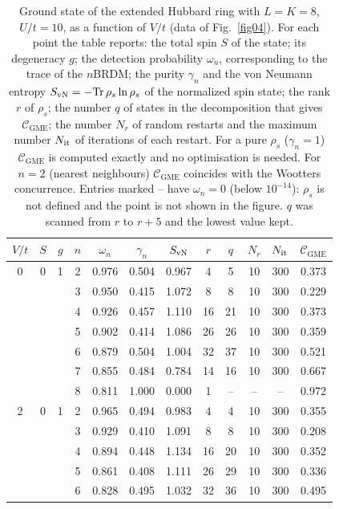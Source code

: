 \documentclass[12pt]{article}
\begin{document}
\begin{table}
\caption{Ground state of the extended Hubbard ring with $L=K=8$, $U/t=10$, as a function of $V/t$ (data of Fig.~\ref{fig04}). For each point the table reports: the total spin $S$ of the state; its degeneracy $g$; the detection probability $\omega_n$, corresponding to the trace of the $n$BRDM; the purity $\gamma_n$ and the von Neumann entropy $S_{\rm vN}=-\mathrm{Tr}\,\rho_s\ln\rho_s$ of the normalized spin state; the rank $r$ of $\rho_s$; the number $q$ of states in the decomposition that gives $\mathcal{C}_{\mathrm{GME}}$; the number $N_r$ of random restarts and the maximum number $N_{\rm it}$ of iterations of each restart. For a pure $\rho_s$ ($\gamma_n=1$) $\mathcal{C}_{\mathrm{GME}}$ is computed exactly and no optimisation is needed. For $n=2$ (nearest neighbours) $\mathcal{C}_{\mathrm{GME}}$ coincides with the Wootters concurrence. Entries marked -- have $\omega_n=0$ (below $10^{-14}$): $\rho_s$ is not defined and the point is not shown in the figure. $q$ was scanned from $r$ to $r+5$ and the lowest value kept.}
\label{tab:vscan_L8}
\begin{ruledtabular}
\begin{tabular}{cccccccccccc}
$V/t$ & $S$ & $g$ & $n$ & $\omega_n$ & $\gamma_n$ & $S_{\rm vN}$ & $r$ & $q$ & $N_r$ & $N_{\rm it}$ & $\mathcal{C}_{\mathrm{GME}}$ \\
\hline
0 & 0 & 1 & 2 & 0.976 & 0.504 & 0.967 & 4 & 5 & 10 & 300 & 0.373 \\
 & &  & 3 & 0.950 & 0.415 & 1.072 & 8 & 8 & 10 & 300 & 0.229 \\
 & &  & 4 & 0.926 & 0.457 & 1.110 & 16 & 21 & 10 & 300 & 0.373 \\
 & &  & 5 & 0.902 & 0.414 & 1.086 & 26 & 26 & 10 & 300 & 0.359 \\
 & &  & 6 & 0.879 & 0.504 & 1.004 & 32 & 37 & 10 & 300 & 0.521 \\
 & &  & 7 & 0.855 & 0.484 & 0.784 & 14 & 16 & 10 & 300 & 0.667 \\
 & &  & 8 & 0.811 & 1.000 & 0.000 & 1 & -- & -- & -- & 0.972 \\
\hline
2 & 0 & 1 & 2 & 0.965 & 0.494 & 0.983 & 4 & 4 & 10 & 300 & 0.355 \\
 & &  & 3 & 0.929 & 0.410 & 1.091 & 8 & 8 & 10 & 300 & 0.208 \\
 & &  & 4 & 0.894 & 0.448 & 1.134 & 16 & 20 & 10 & 300 & 0.352 \\
 & &  & 5 & 0.861 & 0.408 & 1.111 & 26 & 29 & 10 & 300 & 0.336 \\
 & &  & 6 & 0.828 & 0.495 & 1.032 & 32 & 36 & 10 & 300 & 0.495 \\

\end{tabular}
\end{ruledtabular}
\end{table}
\end{document}
